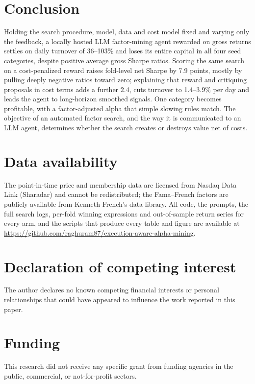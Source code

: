 \documentclass[preprint,12pt,authoryear]{elsarticle}
\begin{document}
\section{Conclusion}\label{sec:conclusion}

Holding the search procedure, model, data and cost model fixed and varying only the feedback, a locally hosted LLM factor-mining agent rewarded on gross returns settles on daily turnover of 36--103\% and loses its entire capital in all four seed categories, despite positive average gross Sharpe ratios. Scoring the same search on a cost-penalized reward raises fold-level net Sharpe by 7.9 points, mostly by pulling deeply negative ratios toward zero; explaining that reward and critiquing proposals in cost terms adds a further 2.4, cuts turnover to 1.4--3.9\% per day and leads the agent to long-horizon smoothed signals. One category becomes profitable, with a factor-adjusted alpha that simple slowing rules match. The objective of an automated factor search, and the way it is communicated to an LLM agent, determines whether the search creates or destroys value net of costs.

\section*{Data availability}

The point-in-time price and membership data are licensed from Nasdaq Data Link (Sharadar) and cannot be redistributed; the Fama--French factors are publicly available from Kenneth French's data library. All code, the prompts, the full search logs, per-fold winning expressions and out-of-sample return series for every arm, and the scripts that produce every table and figure are available at \url{https://github.com/raghuram87/execution-aware-alpha-mining}.

\section*{Declaration of competing interest}

The author declares no known competing financial interests or personal relationships that could have appeared to influence the work reported in this paper.

\section*{Funding}

This research did not receive any specific grant from funding agencies in the public, commercial, or not-for-profit sectors.
\end{document}
